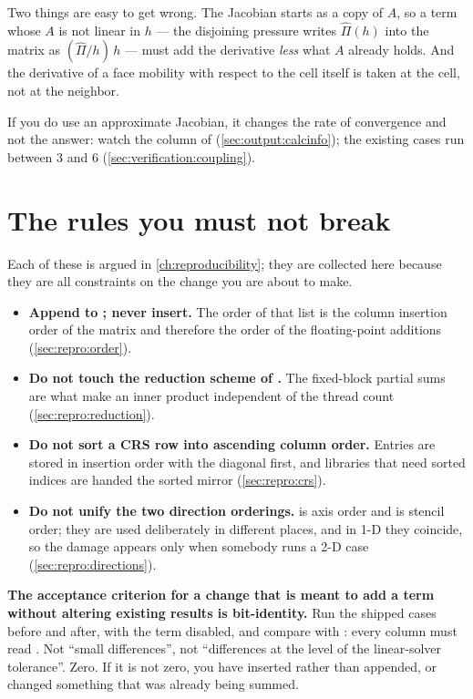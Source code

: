 Two things are easy to get wrong. The Jacobian starts as a copy of $A$, so a
term whose $A$ is not linear in $h$ --- the disjoining pressure writes
$\hat\Pi(h)$ into the matrix as $(\hat\Pi/h)\,h$ --- must add the derivative
\emph{less} what $A$ already holds. And the derivative of a face mobility
with respect to the cell itself is taken at the cell, not at the neighbor.

If you do use an approximate Jacobian, it changes the rate of convergence and
not the answer: watch the  column of 
(\cref{sec:output:calcinfo}); the existing cases run between 3 and 6
(\cref{sec:verification:coupling}).



\section{The rules you must not break}
\label{sec:extending:rules}

\begin{warn}
  Each of these is argued in \cref{ch:reproducibility}; they are collected here
  because they are all constraints on the change you are about to make.

  \begin{itemize}
    \item \textbf{Append to ; never insert.} The order
      of that list is the column insertion order of the matrix and therefore
      the order of the floating-point additions (\cref{sec:repro:order}).
    \item \textbf{Do not touch the reduction scheme of .} The
      fixed-block partial sums are what make an inner product independent of
      the thread count (\cref{sec:repro:reduction}).
    \item \textbf{Do not sort a CRS row into ascending column order.} Entries
      are stored in insertion order with the diagonal first, and libraries that
      need sorted indices are handed the sorted mirror
      (\cref{sec:repro:crs}).
    \item \textbf{Do not unify the two direction orderings.} 
      is axis order and  is stencil order; they are used
      deliberately in different places, and in 1-D they coincide, so the
      damage appears only when somebody runs a 2-D case
      (\cref{sec:repro:directions}).
  \end{itemize}

  \textbf{The acceptance criterion for a change that is meant to add a term
  without altering existing results is bit-identity.} Run the shipped cases
  before and after, with the term disabled, and compare with
  : every column must read . Not ``small
  differences'', not ``differences at the level of the linear-solver tolerance''.
  Zero. If it is not zero, you have inserted rather than appended, or changed
  something that was already being summed.
\end{warn}

